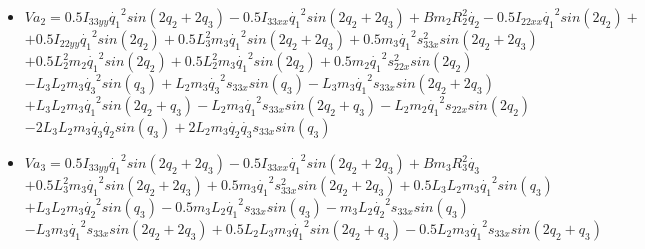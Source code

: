 \begin{itemize}
	\item $Va_{2}=0.5I_{33yy}\dot{q_{1}}^{2}sin(2q_{2}+2q_{3}) -0.5I_{33xx}\dot{q_{1}}^{2}sin(2q_{2}+2q_{3}) +Bm_{2}R_{2}^{2}\dot{q_{2}} -0.5I_{22xx}\dot{q_{1}}^{2}sin(2q_{2})+ $ \\ \vspace{0.1cm}
	$+0.5I_{22yy}\dot{q_{1}}^{2}sin(2q_{2}) +0.5L_{3}^{2}m_{3} \dot{q_{1}}^{2}sin(2q_{2}+2q_{3}) +0.5m_{3}\dot{q_{1}}^{2}s_{33x}^{2}sin(2q_{2}+2q_{3}) $ \\ \vspace{0.1cm}
  $+0.5L_{2}^{2}m_{2} \dot{q_{1}}^{2}sin(2q_{2}) +0.5L_{2}^{2}m_{3} \dot{q_{1}}^{2}sin(2q_{2}) +0.5m_{2} \dot{q_{1}}^{2}s_{22x}^{2}sin(2q_{2}) $ \\ \vspace{0.1cm}
	$-L_{3}L_{2}m_{3} \dot{q_{3}}^{2}sin(q_{3}) +L_{2}m_{3}\dot{q_{3}}^{2}s_{33x}sin(q_{3}) -L_{3}m_{3}\dot{q_{1}}^{2}s_{33x}sin(2q_{2}+2q_{3}) $ \\ \vspace{0.1cm}
	$ +L_{3}L_{2}m_{3} \dot{q_{1}}^{2}sin(2q_{2}+q_{3}) -L_{2}m_{3}\dot{q_{1}}^{2}s_{33x}sin(2q_{2}+q_{3}) -L_{2}m_{2}\dot{q_{1}}^{2}s_{22x}sin(2q_{2}) $ \\ \vspace{0.1cm}
	$-2L_{3}L_{2}m_{3} \dot{q_{3}}\dot{q_{2}}sin(q_{3}) +2L_{2}m_{3} \dot{q_{2}}\dot{q_{3}}s_{33x}sin(q_{3}) $ \\ \vspace{0.2cm}

	\item $Va_{3}=0.5I_{33yy}\dot{q_{1}}^{2}sin(2q_{2}+2q_{3}) -0.5I_{33xx}\dot{q_{1}}^{2}sin(2q_{2}+2q_{3}) +Bm_{3}R_{3}^{2}\dot{q_{3}} $ \\ \vspace{0.1cm}
	$ +0.5L_{3}^{2}m_{3} \dot{q_{1}}^{2}sin(2q_{2}+2q_{3}) +0.5m_{3}\dot{q_{1}}^{2}s_{33x}^{2}sin(2q_{2}+2q_{3}) +0.5L_{3}L_{2}m_{3} \dot{q_{1}}^{2}sin(q_{3}) $ \\ \vspace{0.1cm}
	$+L_{3}L_{2}m_{3} \dot{q_{2}}^{2}sin(q_{3}) -0.5m_{3}L_{2}\dot{q_{1}}^{2}s_{33x}sin(q_{3}) -m_{3}L_{2}\dot{q_{2}}^{2}s_{33x}sin(q_{3}) $ \\ \vspace{0.1cm}
	$-L_{3}m_{3}\dot{q_{1}}^{2}s_{33x}sin(2q_{2}+2q_{3}) +0.5L_{2}L_{3}m_{3}\dot{q_{1}}^{2}sin(2q_{2}+q_{3}) -0.5L_{2}m_{3}\dot{q_{1}}^{2}s_{33x}sin(2q_{2}+q_{3})$ \\
\end{itemize}

